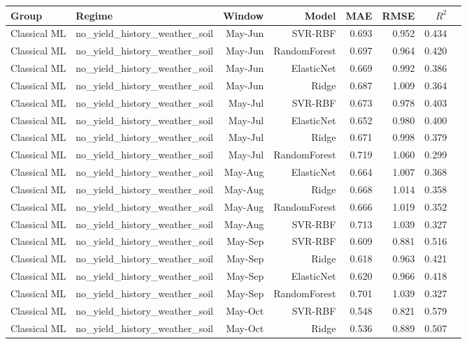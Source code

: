 \begin{tabular}{llrrrrrr}
\toprule
Group & Regime & Window & Model & MAE & RMSE & $R^2$ \\
\midrule
Classical ML & no\_yield\_history\_weather\_soil & May-Jun & SVR-RBF & 0.693 & 0.952 & 0.434 \\
Classical ML & no\_yield\_history\_weather\_soil & May-Jun & RandomForest & 0.697 & 0.964 & 0.420 \\
Classical ML & no\_yield\_history\_weather\_soil & May-Jun & ElasticNet & 0.669 & 0.992 & 0.386 \\
Classical ML & no\_yield\_history\_weather\_soil & May-Jun & Ridge & 0.687 & 1.009 & 0.364 \\
Classical ML & no\_yield\_history\_weather\_soil & May-Jul & SVR-RBF & 0.673 & 0.978 & 0.403 \\
Classical ML & no\_yield\_history\_weather\_soil & May-Jul & ElasticNet & 0.652 & 0.980 & 0.400 \\
Classical ML & no\_yield\_history\_weather\_soil & May-Jul & Ridge & 0.671 & 0.998 & 0.379 \\
Classical ML & no\_yield\_history\_weather\_soil & May-Jul & RandomForest & 0.719 & 1.060 & 0.299 \\
Classical ML & no\_yield\_history\_weather\_soil & May-Aug & ElasticNet & 0.664 & 1.007 & 0.368 \\
Classical ML & no\_yield\_history\_weather\_soil & May-Aug & Ridge & 0.668 & 1.014 & 0.358 \\
Classical ML & no\_yield\_history\_weather\_soil & May-Aug & RandomForest & 0.666 & 1.019 & 0.352 \\
Classical ML & no\_yield\_history\_weather\_soil & May-Aug & SVR-RBF & 0.713 & 1.039 & 0.327 \\
Classical ML & no\_yield\_history\_weather\_soil & May-Sep & SVR-RBF & 0.609 & 0.881 & 0.516 \\
Classical ML & no\_yield\_history\_weather\_soil & May-Sep & Ridge & 0.618 & 0.963 & 0.421 \\
Classical ML & no\_yield\_history\_weather\_soil & May-Sep & ElasticNet & 0.620 & 0.966 & 0.418 \\
Classical ML & no\_yield\_history\_weather\_soil & May-Sep & RandomForest & 0.701 & 1.039 & 0.327 \\
Classical ML & no\_yield\_history\_weather\_soil & May-Oct & SVR-RBF & 0.548 & 0.821 & 0.579 \\
Classical ML & no\_yield\_history\_weather\_soil & May-Oct & Ridge & 0.536 & 0.889 & 0.507 \\

\end{tabular}

